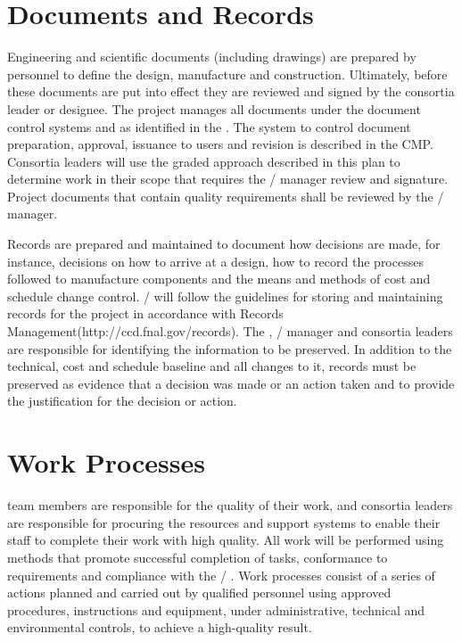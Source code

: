 \section{Documents and Records}

Engineering and scientific documents (including drawings) are prepared
by  personnel to define the design, manufacture and
construction. Ultimately, before these documents are put into effect
they are reviewed and signed by the  consortia leader or
designee. The  project manages all documents under the
document control systems  and \docdb as identified in the
 .  The system to control document preparation,
approval, issuance to users and revision is described in the
CMP. Consortia leaders will use the graded approach described in this
plan to determine work in their scope that requires the
/  manager review and
signature. Project documents that contain quality requirements shall
be reviewed by the /  manager.

Records are prepared and maintained to document how decisions are
made, for instance, decisions on how to arrive at a design, how to
record the processes followed to manufacture components and the means
and methods of cost and schedule change
control. / will follow the guidelines for
storing and maintaining records for the project in accordance with
\fnal Records Management(http://ccd.fnal.gov/records). The
 , / 
manager and consortia leaders are responsible for identifying the
information to be preserved. In addition to the technical, cost and
schedule baseline and all changes to it, records must be preserved as
evidence that a decision was made or an action taken and to provide
the justification for the decision or action.

\section{Work Processes}

 team members are responsible for the quality of their
work, and consortia leaders are responsible for procuring the
resources and support systems to enable their staff to complete their
work with high quality. All  work will be performed using
methods that promote successful completion of tasks, conformance to
 requirements and compliance with the
/ . Work processes consist of a
series of actions planned and carried out by qualified personnel using
approved procedures, instructions and equipment, under administrative,
technical and environmental controls, to achieve a high-quality
result.

